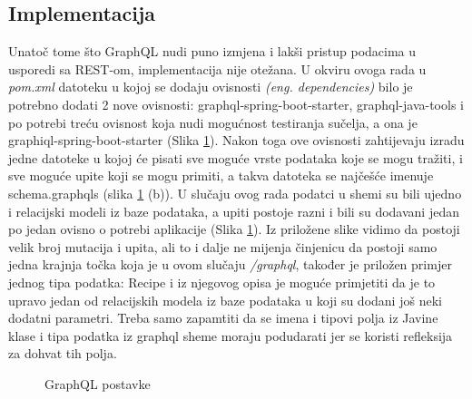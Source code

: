 \documentclass[times, utf8, zavrsni]{fer}
\begin{document}
\subsection{Implementacija}
Unatoč tome što GraphQL nudi puno izmjena i lakši pristup podacima u usporedi sa REST-om, implementacija
nije otežana. U okviru ovoga rada u \textit{pom.xml} datoteku u kojoj se dodaju ovisnosti \textit{(eng. dependencies)}
bilo je potrebno dodati 2 nove ovisnosti: graphql-spring-boot-starter, graphql-java-tools
i po potrebi treću ovisnost koja nudi mogućnost testiranja sučelja,
a ona je graphiql-spring-boot-starter (Slika \ref{fig:graphql}). Nakon toga ove ovisnosti zahtijevaju
izradu jedne datoteke u kojoj će pisati sve moguće vrste podataka koje se mogu tražiti, i sve
moguće upite koji se mogu primiti, a takva datoteka se najčešće imenuje schema.graphqls (slika \ref{fig:graphql} (b)).
U slučaju ovog rada podatci u shemi su bili ujedno i relacijski modeli iz baze podataka,
a upiti postoje razni i bili su dodavani jedan po jedan ovisno o potrebi aplikacije (Slika \ref{fig:graphql}).
Iz priložene slike vidimo da postoji velik broj mutacija i upita, ali to i dalje ne mijenja činjenicu da postoji
samo jedna krajnja točka koja je u ovom slučaju \textit{/graphql}, također je priložen primjer jednog tipa podatka: Recipe
i iz njegovog opisa je moguće primjetiti da je to upravo jedan od relacijskih modela iz baze podataka u koji su dodani
još neki dodatni parametri. Treba samo zapamtiti da se imena i tipovi polja iz Javine klase i tipa podatka iz
graphql sheme moraju podudarati jer se koristi refleksija za dohvat tih polja.
\begin{figure}[h]
      \centering
      \caption{GraphQL postavke}
      \label{fig:graphql}
\end{figure}
\end{document}
